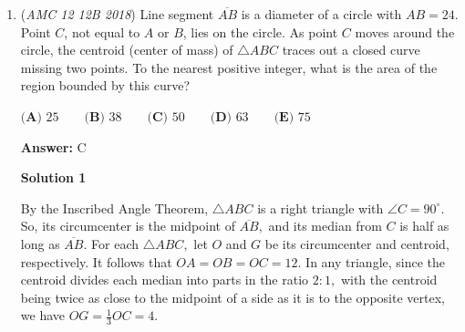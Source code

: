 \begin{enumerate}
 \textbf{Answer: }C



\textbf{Solution 1}

From the Change of Base Formula, we have 
 \[\frac{\prod_{i=3}^{13} \log (2i+1)}{\prod_{i=1}^{11}\log (2i+1)} = \frac{\log 25 \cdot \log 27}{\log 3 \cdot \log 5} = \frac{(2\log 5)\cdot(3\log 3)}{\log 3 \cdot \log 5} = \boxed{\textbf{(C) } 6}.\]




\textbf{Solution 2}

Using the chain rule of logarithms $\log _{a} b \cdot \log _{b} c = \log _{a} c,$ we get
 \begin{align*} \log_37\cdot\log_59\cdot\log_711\cdot\log_913\cdots\log_{21}25\cdot\log_{23}27 &= (\log _{3} 7 \cdot \log _{7} 11 \cdots \log _{23} 27) \cdot (\log _{5} 9 \cdot \log _{9} 13 \cdots \log _{21} 25) \\ &= \log _{3} 27 \cdot \log _{5} 25 \\ &= 3 \cdot 2 \\ &= \boxed{\textbf{(C) } 6}. \end{align*}




	\item (\textit{AMC 12 12B 2018}) Line segment $\overline{AB}$ is a diameter of a circle with $AB = 24$. Point $C$, not equal to $A$ or $B$, lies on the circle. As point $C$ moves around the circle, the centroid (center of mass) of $\triangle ABC$ traces out a closed curve missing two points. To the nearest positive integer, what is the area of the region bounded by this curve?


 $\textbf{(A) } 25 \qquad \textbf{(B) } 38  \qquad \textbf{(C) } 50  \qquad \textbf{(D) } 63 \qquad \textbf{(E) } 75$

 \textbf{Answer: }C



\textbf{Solution 1}

By the Inscribed Angle Theorem, $\triangle ABC$ is a right triangle with $\angle C=90^{\circ}.$ So, its circumcenter is the midpoint of $\overline{AB},$ and its median from $C$ is half as long as $\overline{AB}.$ For each $\triangle ABC,$ let $O$ and $G$ be its circumcenter and centroid, respectively. It follows that $OA=OB=OC=12.$ In any triangle, since the centroid divides each median into parts in the ratio $2:1,$ with the centroid being twice as close to the midpoint of a side as it is to the opposite vertex, we have $OG=\frac13 OC=4.$


\end{enumerate}
